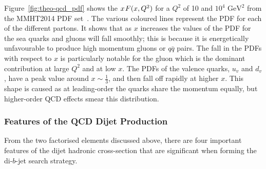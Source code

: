 Figure~\ref{fig:theo-qcd_pdf} shows the $x\hspace{0.3mm}F(x,Q^2)$ for a $Q^2$ of 10 and $10^4$ $\text{GeV}^2$
from the MMHT2014 PDF set~\cite{theo-qcd_pdf}.
The various coloured lines represent the PDF for each of the different partons.
It shows that as $x$ increases the values of the PDF for the sea quarks and gluons will fall smoothly;
this is because it is energetically unfavourable to produce high momentum gluons or $q\bar{q}$ pairs.
The fall in the PDFs with respect to $x$ is particularly notable for the gluon which is the dominant contribution at large $Q^2$ and at low $x$.
The PDFs of the valence quarks, $u_v$ and $d_v$, have a peak value around $x \sim \frac{1}{3}$, and then fall off rapidly at higher $x$.
This shape is caused as at leading-order the quarks share the momentum equally, but higher-order QCD effects smear this distribution.



\subsubsection{Features of the QCD Dijet Production}
\label{sec:theo-qcd-dijet_features}

From the two factorised elements discussed above,
there are four important features of the dijet hadronic cross-section
that are significant when forming the di-$b$-jet search strategy.%

